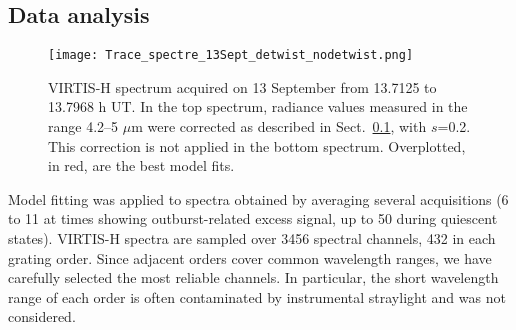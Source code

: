 \documentclass[a4paper,fleqn,usenatbib]{mnras}
\begin{document}


\subsection{Data analysis}
\label{sec:reduction}
\begin{figure}
    \texttt{[image: Trace\_spectre\_13Sept\_detwist\_nodetwist.png]}
       \caption{VIRTIS-H spectrum acquired on 13 September from 13.7125 to 13.7968 h UT. In the top spectrum, radiance values measured in the range 4.2--5 $\mu$m were corrected as described in Sect.~\ref{sec:reduction}, with $s$=0.2. This correction is not applied in the bottom spectrum. Overplotted, in red, are the best model fits.      }
    \label{fig:spectra2}
\end{figure}

Model fitting was applied to spectra obtained by averaging several acquisitions (6 to 11 at times showing outburst-related excess signal, up to 50 during quiescent states).
VIRTIS-H spectra are sampled over 3456 spectral channels, 432 in each grating order. Since adjacent orders cover common wavelength ranges, we have carefully selected the most reliable channels. In particular,
the short wavelength range of each order is often contaminated by instrumental straylight \citep{dbm2016} and was not considered.

\end{document}
